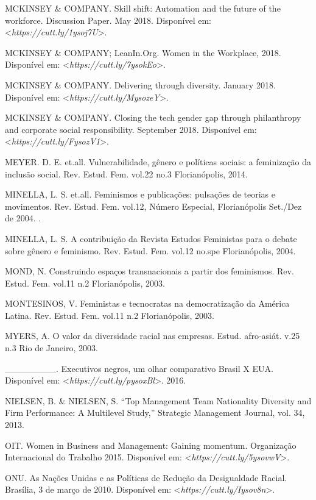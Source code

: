 \begin{Parskip}
MCKINSEY \& COMPANY. Skill shift: Automation and the future of the
workforce. Discussion Paper. May 2018.
Disponível em: \textless{}\emph{https://cutt.ly/1ysoj7U}\textgreater{}.

MCKINSEY \& COMPANY; LeanIn.Org. Women in the Workplace, 2018.
Disponível em: \textless{}\emph{https://cutt.ly/7ysokEo}\textgreater{}.

MCKINSEY \& COMPANY. Delivering through diversity. January 2018.
Disponível em: \textless{}\emph{https://cutt.ly/MysozeY}\textgreater{}.

MCKINSEY \& COMPANY. Closing the tech gender gap through philanthropy
and corporate social responsibility. September 2018.
Disponível em: \textless{}\emph{https://cutt.ly/FysozV1}\textgreater{}.

MEYER. D. E. et.all. Vulnerabilidade, gênero e políticas sociais: a
feminização da inclusão social. Rev. Estud. Fem. vol.22 no.3
Florianópolis, 2014.

MINELLA, L. S. et.all. Feminismos e publicações: pulsações de teorias e
movimentos. Rev. Estud. Fem. vol.12, Número Especial, Florianópolis
Set./Dez de 2004. .

MINELLA, L. S. A contribuição da Revista Estudos Feministas para o
debate sobre gênero e feminismo. Rev. Estud. Fem. vol.12 no.spe
Florianópolis, 2004.

MOND, N. Construindo espaços transnacionais a partir dos feminismos.
Rev. Estud. Fem. vol.11 n.2 Florianópolis, 2003.

MONTESINOS, V. Feministas e tecnocratas na democratização da América
Latina. Rev. Estud. Fem. vol.11 n.2 Florianópolis, 2003.

MYERS, A. O valor da diversidade racial nas empresas. Estud. afro-asiát.
v.25 n.3 Rio de Janeiro, 2003.

\_\_\_\_\_\_\_\_. Executivos negros, um olhar comparativo Brasil X EUA.
Disponível em: \textless{}\emph{https://cutt.ly/pysoxBl}\textgreater{}.
2016.

NIELSEN, B. \& NIELSEN, S. ``Top Management Team Nationality Diversity
and Firm Performance: A Multilevel Study,'' Strategic Management
Journal, vol. 34, 2013.

OIT. Women in Business and Management: Gaining momentum. Organização
Internacional do Trabalho 2015.
Disponível em: \textless{}\emph{https://cutt.ly/5ysovwV}\textgreater{}.

ONU. As Nações Unidas e as Políticas de Redução da Desigualdade Racial.
Brasília, 3 de março de 2010.
Disponível em: \textless{}\emph{https://cutt.ly/Iysov8n}\textgreater{}.


\end{Parskip}
